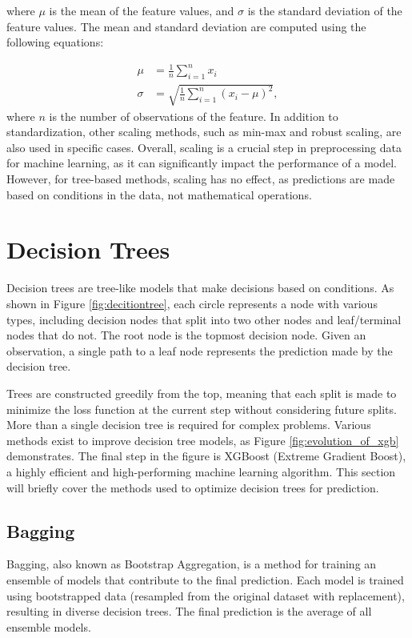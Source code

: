 where $\mu$ is the mean of the feature values, and $\sigma$ is the standard deviation of the feature values.
The mean and standard deviation are computed using the following equations:

\begin{align}
\mu &= \frac{1}{n}\sum_{i=1}^{n}x_i\\
\sigma &= \sqrt{\frac{1}{n}\sum_{i=1}^{n}(x_i - \mu)^2},
\end{align}
where $n$ is the number of observations of the feature.
In addition to standardization, other scaling methods, such as min-max and robust scaling, are also used in specific cases.
Overall, scaling is a crucial step in preprocessing data for machine learning, as it can significantly impact the performance of a model.
However, for tree-based methods, scaling has no effect, as predictions are made based on conditions in the data, not mathematical operations.


\section{Decision Trees}
Decision trees are tree-like models that make decisions based on conditions.
As shown in Figure \ref{fig:decitiontree}, each circle represents a node with various types, including decision nodes that split into two other nodes and leaf/terminal nodes that do not.
The root node is the topmost decision node.
Given an observation, a single path to a leaf node represents the prediction made by the decision tree.

Trees are constructed greedily from the top, meaning that each split is made to minimize the loss function at the current step without considering future splits.
More than a single decision tree is required for complex problems.
Various methods exist to improve decision tree models, as Figure \ref{fig:evolution_of_xgb} demonstrates.
The final step in the figure is XGBoost (Extreme Gradient Boost), a highly efficient and high-performing machine learning algorithm.
This section will briefly cover the methods used to optimize decision trees for prediction.
\cite{Mehta_2019}


\subsection{Bagging}
Bagging, also known as Bootstrap Aggregation, is a method for training an ensemble of models that contribute to the final prediction.
Each model is trained using bootstrapped data (resampled from the original dataset with replacement), resulting in diverse decision trees.
The final prediction is the average of all ensemble models.

